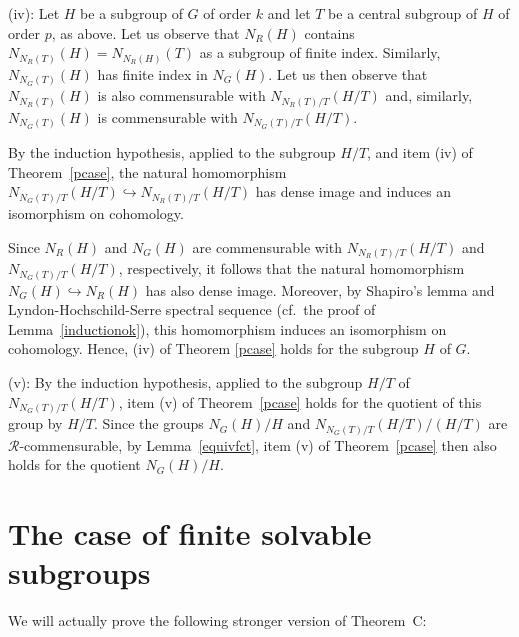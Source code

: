 \documentclass[12pt,twoside]{amsart}
\newcommand\cR{{\mathcal R}}
\newcommand\hookra{\hookrightarrow}
\theoremstyle{definition}
\begin{document}
\noindent
(iv): Let  $H$ be a subgroup of $G$ of order $k$ and let $T$ be a central subgroup of $H$ of order $p$, as above.
Let us observe that $N_{R}(H)$ contains $N_{N_{R}(T)}(H)=N_{N_{R}(H)}(T)$ as a subgroup of finite index.
Similarly, $N_{N_{G}(T)}(H)$ has finite index in $N_{G}(H)$. 
Let us then observe that $N_{N_{R}(T)}(H)$ is also commensurable with $N_{N_{R}(T)/T}(H/T)$ and, similarly,
$N_{N_{G}(T)}(H)$ is commensurable with $N_{N_{G}(T)/T}(H/T)$.

By the induction hypothesis, applied to the subgroup $H/T$, and item (iv) of Theorem~\ref{pcase}, the natural homomorphism 
$N_{N_{G}(T)/T}(H/T)\hookra N_{N_{R}(T)/T}(H/T)$ has dense image and induces an isomorphism on cohomology. 

Since $N_{R}(H)$ and $N_{G}(H)$ are commensurable with $N_{N_{R}(T)/T}(H/T)$ and $N_{N_{G}(T)/T}(H/T)$, respectively, it follows that
the natural homomorphism $N_{G}(H)\hookra N_{R}(H)$ has also dense image. Moreover, by Shapiro's lemma and Lyndon-Hochschild-Serre 
spectral sequence (cf.\ the proof of Lemma~\ref{inductionok}), this homomorphism induces an isomorphism on cohomology.
Hence, (iv) of Theorem \ref{pcase} holds for the subgroup $H$ of $G$.
\smallskip

\noindent
(v):  By the induction hypothesis, applied to the subgroup $H/T$ of $N_{N_{G}(T)/T}(H/T)$, item (v) of Theorem~\ref{pcase} holds for 
the quotient of this group by $H/T$. Since the groups $N_{G}(H)/H$ and $N_{N_{G}(T)/T}(H/T)/(H/T)$ are $\cR$-commensurable,
by Lemma~\ref{equivfct}, item (v) of Theorem~\ref{pcase} then also holds for the quotient $N_{G}(H)/H$.







\section{The case of finite solvable subgroups}
We will actually prove the following stronger version of Theorem~C:
\end{document}
